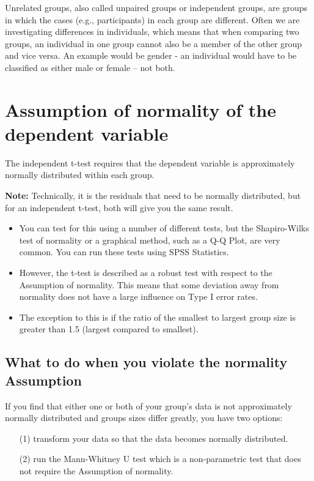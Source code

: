 \documentclass[]{article}
\begin{document}
Unrelated groups, also called unpaired groups or independent groups, are groups in which the cases (e.g., participants) in each group are different. Often we are investigating differences in individuals, which means that when comparing two groups, an individual in one group cannot also be a member of the other group and vice versa. An example would be gender - an individual would have to be classified as either male or female – not both.

\section{Assumption of normality of the dependent variable}
The independent t-test requires that the dependent variable is approximately normally distributed within each group.

\begin{framed}
\noindent \textbf{Note:} Technically, it is the residuals that need to be normally distributed, but for an independent t-test, both will give you the same result.
\end{framed}
\begin{itemize}
	\item You can test for this using a number of different tests, but the Shapiro-Wilks test of normality or a graphical method, such as a Q-Q Plot, are very common. You can run these tests using SPSS Statistics.
	\item However, the t-test is described as a robust test with respect to the Assumption of normality. This means that some deviation away from normality does not have a large influence on Type I error rates.
	\item The exception to this is if the ratio of the smallest to largest group size is greater than 1.5 (largest compared to smallest).
\end{itemize}


\subsection{What to do when you violate the normality Assumption}
If you find that either one or both of your group's data is not approximately normally distributed and groups sizes differ greatly, you have two options: 
\begin{itemize}
	\item[(1)] transform your data so that the data becomes normally distributed. %
	\item[(2)] run the Mann-Whitney U test which is a non-parametric test that does not require the Assumption of normality. %
\end{itemize}
\end{document}
